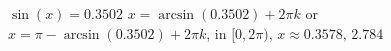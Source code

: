  {$\sin(x) = 0.3502$}
{ $x = \arcsin(0.3502) + 2\pi k$ or $x = \pi - \arcsin(0.3502) + 2\pi k$, in  $[0, 2\pi)$, $x \approx 0.3578, \,2.784$}
